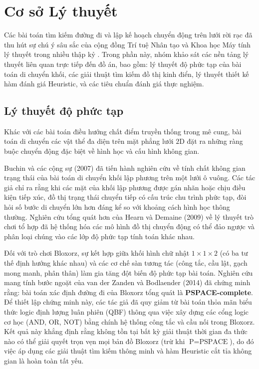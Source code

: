 \section{Cơ sở Lý thuyết}
\label{sec:related_work}

Các bài toán tìm kiếm đường đi và lập kế hoạch chuyển động trên
lưới rời rạc đã thu hút sự chú ý sâu sắc của cộng đồng Trí tuệ
Nhân tạo và Khoa học Máy tính lý thuyết trong nhiều thập kỷ
\cite{russell2020aima, edelkamp2011heuristic}. Trong phần này,
nhóm khảo sát các nền tảng lý thuyết liên quan trực tiếp đến
đồ án, bao gồm: lý thuyết độ phức tạp của bài toán di chuyển khối,
các giải thuật tìm kiếm đồ thị kinh điển, lý thuyết thiết kế
hàm đánh giá Heuristic, và các tiêu chuẩn đánh giá thực nghiệm.

\subsection{Lý thuyết độ phức tạp}
\label{subsec:related_complexity}
Khác với các bài toán điều hướng chất điểm truyền thống trong mê cung,
bài toán di chuyển các vật thể đa diện trên mặt phẳng lưới $2\text{D}$ đặt
ra những ràng buộc chuyển động đặc biệt về hình học và cấu hình không gian.

Buchin và các cộng sự (2007) \cite{buchin2007rolling} đã tiến hành
nghiên cứu về tính chất không gian trạng thái của bài toán di chuyển
khối lập phương trên một lưới ô vuông. Các tác giả chỉ ra rằng khi các mặt
của khối lập phương được gán nhãn hoặc chịu điều kiện tiếp xúc, đồ thị
trạng thái chuyển tiếp có cấu trúc chu trình phức tạp, đòi hỏi số bước
di chuyển lớn hơn đáng kể so với khoảng cách hình học thông thường.
Nghiên cứu tổng quát hơn của Hearn và Demaine (2009) \cite{hearn2009games}
về lý thuyết trò chơi tổ hợp đã hệ thống hóa các mô hình đồ thị chuyển
động có thể đảo ngược và phân loại chúng vào các lớp độ phức tạp tính toán
khác nhau.

Đối với trò chơi Bloxorz, sự kết hợp giữa khối hình chữ nhật
$1 \times 1 \times 2$ (có ba tư thế định hướng khác nhau) và các cơ
chế sàn tương tác (công tắc, cầu lật, gạch mong manh, phân thân) làm
gia tăng đột biến độ phức tạp bài toán. Nghiên cứu mang tính bước ngoặt
của van der Zanden và Bodlaender (2014) \cite{vanderzanden2014bloxorz}
đã chứng minh rằng: bài toán xác định đường đi của Bloxorz
tổng quát là \textbf{PSPACE-complete}. Để thiết lập chứng minh này,
các tác giả đã quy giảm từ bài toán thỏa mãn biểu thức
logic định lượng luân phiên (QBF) thông qua việc xây dựng các cổng
logic cơ học (AND, OR, NOT) bằng chính hệ thống công tắc và cầu nối trong
Bloxorz. Kết quả này khẳng định rằng không tồn tại bất kỳ giải thuật
thời gian đa thức nào có thể giải quyết trọn vẹn mọi bản đồ Bloxorz
(trừ khi $\text{P} = \text{PSPACE}$), do đó việc áp dụng các giải thuật
tìm kiếm thông minh và hàm Heuristic cắt tỉa không gian là hoàn toàn tất yếu.

